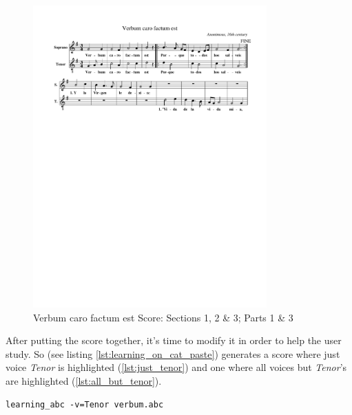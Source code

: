 \begin{figure}[H]
  \centering
  \includegraphics[width=0.8\textwidth, clip=true, trim = 15mm 180mm 15mm 30mm]{img/verbum.pdf}
  \caption{Verbum caro factum est Score: Sections 1, 2 \& 3; Parts 1 \& 3}
  \label{fig:verbum}
\end{figure}

After putting the score together, it's time to modify it in order to help the user study. So
\learningabc{} (see listing \ref{lst:learning_on_cat_paste}) generates a score where just voice
\emph{Tenor} is highlighted (\ref{lst:just_tenor}) and one where all voices but \emph{Tenor}'s are
highlighted (\ref{lst:all_but_tenor}).\\

\begin{lstlisting}[caption={\learningabc{} on combined score},label={lst:learning_on_cat_paste},captionpos=t,abovecaptionskip=-\medskipamount]
learning_abc -v=Tenor verbum.abc
\end{lstlisting}



